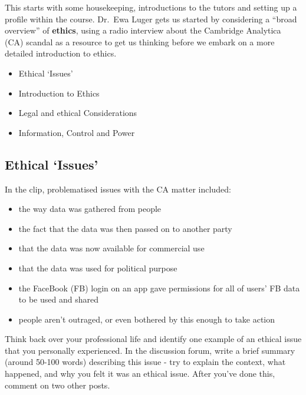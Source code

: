 \documentclass[
]{book}
\providecommand{\tightlist}{%
  \setlength{\itemsep}{0pt}\setlength{\parskip}{0pt}}
\begin{document}
This starts with some housekeeping, introductions to the tutors and setting up a profile within the course. Dr.~Ewa Luger gets us started by considering a ``broad overview'' of \textbf{ethics}, using a radio interview about the Cambridge Analytica (CA) scandal as a resource to get us thinking before we embark on a more detailed introduction to ethics.

\begin{itemize}
\tightlist
\item
  Ethical `Issues'
\item
  Introduction to Ethics
\item
  Legal and ethical Considerations
\item
  Information, Control and Power
\end{itemize}

\hypertarget{ethical-issues}{%
\subsection{Ethical `Issues'}\label{ethical-issues}}

In the clip, problematised issues with the CA matter included:

\begin{itemize}
\tightlist
\item
  the way data was gathered from people
\item
  the fact that the data was then passed on to another party
\item
  that the data was now available for commercial use
\item
  that the data was used for political purpose
\item
  the FaceBook (FB) login on an app gave permissions for all of users' FB data to be used and shared
\item
  people aren't outraged, or even bothered by this enough to take action
\end{itemize}

\begin{description}
\tightlist
\item[Discussion forum task]
Think back over your professional life and identify one example of an ethical issue that you personally experienced. In the discussion forum, write a brief summary (around 50-100 words) describing this issue - try to explain the context, what happened, and why you felt it was an ethical issue. After you've done this, comment on two other posts.
\end{description}
\end{document}
